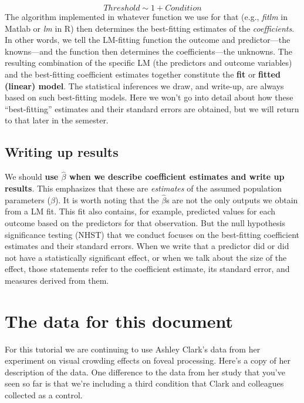 \documentclass[
]{article}
\begin{document}
\[ Threshold \sim 1 + Condition \] The algorithm implemented in whatever
function we use for that (e.g., \emph{fitlm} in Matlab or \emph{lm} in
R) then determines the best-fitting estimates of the
\emph{coefficients}. In other words, we tell the LM-fitting function the
outcome and predictor---the knowns---and the function then determines
the coefficients---the unknowns. The resulting combination of the
specific LM (the predictors and outcome variables) and the best-fitting
coefficient estimates together constitute the \textbf{fit} or
\textbf{fitted (linear) model}. The statistical inferences we draw, and
write-up, are always based on such best-fitting models. Here we won't go
into detail about how these ``best-fitting'' estimates and their
standard errors are obtained, but we will return to that later in the
semester.

\hypertarget{writing-up-results}{%
\subsection{Writing up results}\label{writing-up-results}}

We should \textbf{use \(\widehat{\beta}\) when we describe coefficient
estimates and write up results}. This emphasizes that these are
\emph{estimates} of the assumed population parameters (\(\beta\)). It is
worth noting that the \(\widehat{\beta}\)s are not the only outputs we
obtain from a LM fit. This fit also contains, for example, predicted
values for each outcome based on the predictors for that observation.
But the null hypothesis significance testing (NHST) that we conduct
focuses on the best-fitting coefficient estimates and their standard
errors. When we write that a predictor did or did not have a
statistically significant effect, or when we talk about the size of the
effect, those statements refer to the coefficient estimate, its standard
error, and measures derived from them.

\hypertarget{the-data-for-this-document}{%
\section{The data for this document}\label{the-data-for-this-document}}

For this tutorial we are continuing to use Ashley Clark's data from her
experiment on visual crowding effects on foveal processing. Here's a
copy of her description of the data. One difference to the data from her
study that you've seen so far is that we're including a third condition
that Clark and colleagues collected as a control.
\end{document}
